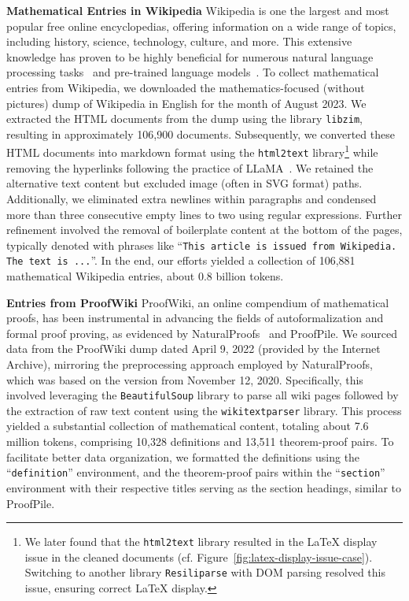 \noindent\textbf{Mathematical Entries in Wikipedia} \quad Wikipedia is one the largest and most popular free online encyclopedias, offering information on a wide range of topics, including history, science, technology, culture, and more. This extensive knowledge has proven to be highly beneficial for numerous natural language processing tasks~ and pre-trained language models~. To collect mathematical entries from Wikipedia, we downloaded the mathematics-focused (without pictures) dump of Wikipedia in English for the month of August 2023. We extracted the HTML documents from the dump using the library \texttt{libzim}, resulting in approximately 106,900 documents. 
Subsequently, we converted these HTML documents into markdown format using the  \texttt{html2text} library\footnote{We later found that the \texttt{html2text} library resulted in the LaTeX display issue in the cleaned documents (cf. Figure~\ref{fig:latex-display-issue-case}). Switching to another library \texttt{Resiliparse} with DOM parsing resolved this issue, ensuring correct LaTeX display.} while removing the hyperlinks following the practice of LLaMA~\citep{DBLP:journals/corr/abs-2302-13971-llama}. We retained the alternative text content but excluded image (often in SVG format) paths. Additionally, we eliminated extra newlines within paragraphs and condensed more than three consecutive empty lines to two using regular expressions. Further refinement involved the removal of boilerplate content at the bottom of the pages, typically denoted with phrases like ``\texttt{This article is issued from Wikipedia. The text is ...}''. In the end, our efforts yielded a collection of 106,881 mathematical Wikipedia entries, about 0.8 billion tokens.

\noindent\textbf{Entries from ProofWiki} \quad ProofWiki, an online compendium of mathematical proofs, has been instrumental in advancing the fields of autoformalization and formal proof proving, as evidenced by NaturalProofs~\citep{DBLP:conf/nips/Welleck0BHCCC21-naturalproofs} and ProofPile. We sourced data from the ProofWiki dump dated April 9, 2022 (provided by the Internet Archive), mirroring the preprocessing approach employed by NaturalProofs, which was based on the version from November 12, 2020. Specifically, this involved leveraging the \texttt{BeautifulSoup} library to parse all wiki pages followed by the extraction of raw text content using the \texttt{wikitextparser} library. This process yielded a substantial collection of mathematical content, totaling about 7.6 million tokens, comprising 10,328 definitions and 13,511 theorem-proof pairs. To facilitate better data organization, we formatted the definitions using the ``\texttt{definition}'' environment, and the theorem-proof pairs within the ``\texttt{section}'' environment with their respective titles serving as the section headings, similar to  ProofPile.

